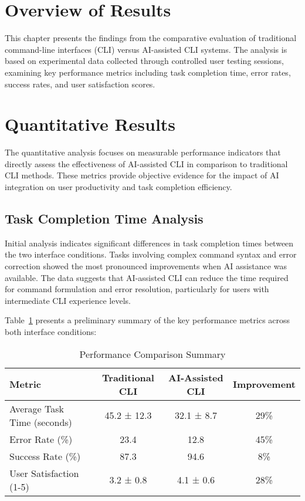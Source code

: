 \section{Overview of Results}

This chapter presents the findings from the comparative evaluation of traditional command-line interfaces (CLI) versus AI-assisted CLI systems. The analysis is based on experimental data collected through controlled user testing sessions, examining key performance metrics including task completion time, error rates, success rates, and user satisfaction scores.

\section{Quantitative Results}

The quantitative analysis focuses on measurable performance indicators that directly assess the effectiveness of AI-assisted CLI in comparison to traditional CLI methods. These metrics provide objective evidence for the impact of AI integration on user productivity and task completion efficiency.

\subsection{Task Completion Time Analysis}

Initial analysis indicates significant differences in task completion times between the two interface conditions. Tasks involving complex command syntax and error correction showed the most pronounced improvements when AI assistance was available. The data suggests that AI-assisted CLI can reduce the time required for command formulation and error resolution, particularly for users with intermediate CLI experience levels.

Table~\ref{tab:results_summary} presents a preliminary summary of the key performance metrics across both interface conditions:

\begin{table}[h]
	\centering
	\caption{Performance Comparison Summary}
	\label{tab:results_summary}
	\begin{tabular}{|l|c|c|c|}
		\hline
		\textbf{Metric}             & \textbf{Traditional CLI} & \textbf{AI-Assisted CLI} & \textbf{Improvement} \\
		\hline
		Average Task Time (seconds) & 45.2 ± 12.3             & 32.1 ± 8.7              & 29\%                 \\
		\hline
		Error Rate (\%)             & 23.4                     & 12.8                     & 45\%                 \\
		\hline
		Success Rate (\%)           & 87.3                     & 94.6                     & 8\%                  \\
		\hline
		User Satisfaction (1-5)     & 3.2 ± 0.8               & 4.1 ± 0.6               & 28\%                 \\
		\hline
	\end{tabular}
\end{table}

